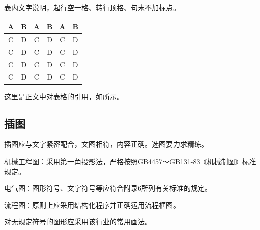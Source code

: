 表内文字说明，起行空一格、转行顶格、句末不加标点。

\begin{table}[h]
    \label{Tab:1}
    \centering
    \begin{tabular}{cccccc}
        \toprule
        A & B &A & B &A & B\\
        \midrule
        C & D & C & D & C & D\\
        C & D & C & D & C & D\\
        C & D & C & D & C & D\\
        C & D & C & D & C & D\\
        \bottomrule
    \end{tabular}
\end{table}


这里是正文中对表格的引用，如所示。

\subsection{插图}

插图应与文字紧密配合，文图相符，内容正确。选图要力求精练。

机械工程图：采用第一角投影法，严格按照GB4457～GB131-83《机械制图》标准规定。

电气图：图形符号、文字符号等应符合附录6所列有关标准的规定。

流程图：原则上应采用结构化程序并正确运用流程框图。

对无规定符号的图形应采用该行业的常用画法。

